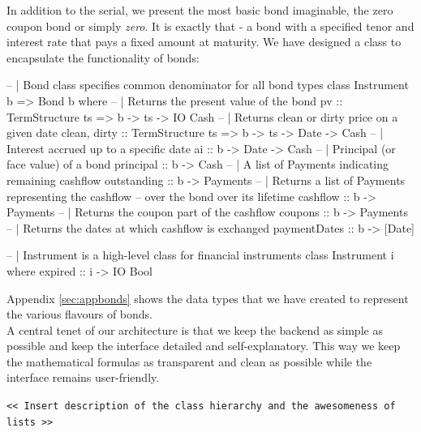 In addition to the serial, we present the most basic bond imaginable, the zero 
coupon bond or simply \emph{zero}. It is exactly that - a bond with a specified 
tenor and interest rate that pays a fixed amount at maturity. We have designed 
a class to encapsulate the functionality of bonds:

\begin{hscode}
-- | Bond class specifies common denominator for all bond types 
class Instrument b => Bond b where
  -- | Returns the present value of the bond
  pv           :: TermStructure ts => b -> ts -> IO Cash
  -- | Returns clean or dirty price on a given date
  clean, dirty :: TermStructure ts => b -> ts -> Date -> Cash
  -- | Interest accrued up to a specific date
  ai           :: b -> Date -> Cash
  -- | Principal (or face value) of a bond
  principal    :: b -> Cash
  -- | A list of Payments indicating remaining cashflow
  outstanding  :: b -> Payments
  -- | Returns a list of Payments representing the cashflow
  -- over the bond over its lifetime
  cashflow     :: b -> Payments
  -- | Returns the coupon part of the cashflow
  coupons      :: b -> Payments
  -- | Returns the dates at which cashflow is exchanged
  paymentDates :: b -> [Date]
\end{hscode}


\begin{hscode}
-- | Instrument is a high-level class for financial instruments
class Instrument i where
  expired :: i -> IO Bool
\end{hscode}



Appendix \ref{sec:appbonds} shows the data types that we have created
to represent the various flavours of bonds.\\ 

A central tenet of our architecture is that we keep the backend
as simple as possible and keep the interface detailed and 
self-explanatory. This way we keep the mathematical formulas as transparent
and clean as possible while the interface remains user-friendly.\\



\begin{center}
\texttt{<< Insert description of the class hierarchy and the awesomeness of
lists >>}\\
\end{center}


